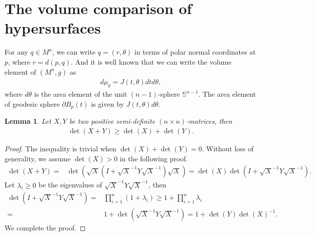 \documentclass[11pt]{amsart}
\newtheorem{lemma}[theorem]{Lemma}
\numberwithin{equation}{section}
\renewcommand{\d}{\mathrm{d}}
\begin{document}
\section{The volume comparison of hypersurfaces}\label{sec area compa}

For any $q\in M^n$,  we can write $q= (r, \theta)$ in terms of polar normal coordinates at $p$, where $r= d(p, q)$.  And it is well known that we can write the volume element of $(M^n,  g)$ as 
\begin{align}
d\mu_g= J(t, \theta)dtd\theta,  \nonumber 
\end{align}
where $d\theta$ is the area element of the unit $(n- 1)$-sphere $\mathbb{S}^{n- 1}$. The area element of geodesic sphere $\partial B_p(t)$ is given by $J(t, \theta)d\theta$.



\begin{lemma}\label{lem det of positive semi definite matrix}
    Let $X, Y$ be two positive semi-definite $(n\times n)$-matrices, then
    \begin{align*}
        \det(X+Y)\geq \det(X)+\det(Y).
    \end{align*}
\end{lemma}
\begin{proof} The inequality is trivial when $\det(X)+\det(Y)=0$. Without loss of generality,  we assume $\det(X)>0$ in the following proof.
\begin{align*}
    \det(X+Y)=&\det(\sqrt{X}(I+\sqrt{X}^{-1}Y\sqrt{X}^{-1})\sqrt{X})=\det(X)\det(I+\sqrt{X}^{-1}Y\sqrt{X}^{-1}).
\end{align*}
Let $\lambda_i\geq 0$ be the eigenvalues of $\sqrt{X}^{-1}Y\sqrt{X}^{-1}$, then 
\begin{align*}
    \det(I+\sqrt{X}^{-1}Y\sqrt{X}^{-1})=& \prod_{i=1}^n(1+\lambda_i)\geq1+\prod_{i=1}^n\lambda_i\\
    =& 1+\det(\sqrt{X}^{-1}Y\sqrt{X}^{-1})=1+\det(Y)\det(X)^{-1}.
\end{align*}
We complete the proof.
\end{proof}
\end{document}
